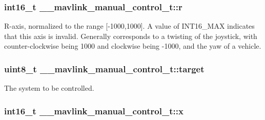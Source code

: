 \hypertarget{struct____mavlink__manual__control__t_a7311c5d986a66ba78c8f3c62e6163d8b}{
\subsubsection[{r}]{\setlength{\rightskip}{0pt plus 5cm}int16\+\_\+t \+\_\+\+\_\+mavlink\+\_\+manual\+\_\+control\+\_\+t\+::r}}\label{struct____mavlink__manual__control__t_a7311c5d986a66ba78c8f3c62e6163d8b}


R-\/axis, normalized to the range \mbox{[}-\/1000,1000\mbox{]}. A value of I\+N\+T16\+\_\+\+M\+A\+X indicates that this axis is invalid. Generally corresponds to a twisting of the joystick, with counter-\/clockwise being 1000 and clockwise being -\/1000, and the yaw of a vehicle. 

\hypertarget{struct____mavlink__manual__control__t_ac69f96effc87ea6377989b2350a2a4eb}{
\subsubsection[{target}]{\setlength{\rightskip}{0pt plus 5cm}uint8\+\_\+t \+\_\+\+\_\+mavlink\+\_\+manual\+\_\+control\+\_\+t\+::target}}\label{struct____mavlink__manual__control__t_ac69f96effc87ea6377989b2350a2a4eb}


The system to be controlled. 

\hypertarget{struct____mavlink__manual__control__t_add34b2bd0b54651701e7d8b2912868a6}{
\subsubsection[{x}]{\setlength{\rightskip}{0pt plus 5cm}int16\+\_\+t \+\_\+\+\_\+mavlink\+\_\+manual\+\_\+control\+\_\+t\+::x}}\label{struct____mavlink__manual__control__t_add34b2bd0b54651701e7d8b2912868a6}


